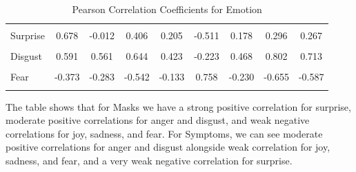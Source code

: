\documentclass{l4proj}
\begin{document}
\begin{table}[H]
{\begin{tabular}{@{}lcccccccc@{}}
         & \multicolumn{1}{l}{}      & \multicolumn{1}{l}{}         & \multicolumn{1}{l}{}          & \multicolumn{1}{l}{}        & \multicolumn{1}{l}{}       & \multicolumn{1}{l}{}        & \multicolumn{1}{l}{}         & \multicolumn{1}{l}{}         \\
Surprise & 0.678                     & -0.012                       & 0.406                         & 0.205                       & -0.511                     & 0.178                       & 0.296                        & 0.267                        \\
         & \multicolumn{1}{l}{}      & \multicolumn{1}{l}{}         & \multicolumn{1}{l}{}          & \multicolumn{1}{l}{}        & \multicolumn{1}{l}{}       & \multicolumn{1}{l}{}        & \multicolumn{1}{l}{}         & \multicolumn{1}{l}{}         \\
Disgust  & 0.591                     & 0.561                        & 0.644                         & 0.423                       & -0.223                     & 0.468                       & 0.802                        & 0.713                        \\
         & \multicolumn{1}{l}{}      & \multicolumn{1}{l}{}         & \multicolumn{1}{l}{}          & \multicolumn{1}{l}{}        & \multicolumn{1}{l}{}       & \multicolumn{1}{l}{}        & \multicolumn{1}{l}{}         & \multicolumn{1}{l}{}         \\
Fear     & -0.373                    & -0.283                       & -0.542                        & -0.133                      & 0.758                      & -0.230                      & -0.655                       & -0.587                       \\
         & \multicolumn{1}{l}{}      & \multicolumn{1}{l}{}         & \multicolumn{1}{l}{}          & \multicolumn{1}{l}{}        & \multicolumn{1}{l}{}       & \multicolumn{1}{l}{}        & \multicolumn{1}{l}{}         & \multicolumn{1}{l}{}         \\ \bottomrule
\end{tabular}%
}
\caption{Pearson Correlation Coefficients for Emotion}
\label{tab:topemo}
\end{table}

The table shows that for Masks we have a strong positive correlation for surprise, moderate positive correlations for anger and disgust, and weak negative correlations for joy, sadness, and fear. For Symptoms, we can see moderate positive correlations for anger and disgust alongside weak correlation for joy, sadness, and fear, and a very weak negative correlation for surprise.
\end{document}
